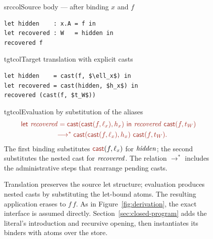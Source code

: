 \begin{figure}[!htbp]
\begin{examplepanel}{srccol}{Source body --- after binding \(x\) and \(f\)}
\begin{lstlisting}[style=source]
let hidden    : x.A = f in
let recovered : W   = hidden in
recovered f
\end{lstlisting}
\end{examplepanel}
\begin{examplepanel}{tgtcol}{Target translation with explicit casts}
\begin{lstlisting}[style=target,mathescape=true]
let hidden    = cast(f, $\ell_x$) in
let recovered = cast(hidden, $h_x$) in
recovered (cast(f, $t_W$))
\end{lstlisting}
\end{examplepanel}
\begin{examplepanel}{tgtcol}{Evaluation by substitution of the aliases}
\small
\[
\tgt{\begin{aligned}
 &\ev{let}\ \ty{recovered}=\cast{\cast{f}{\ell_x}}{h_x}\ \ev{in}\
       \ty{recovered}\ \cast{f}{t_W}\\
 &\hspace{5em}\longrightarrow^{*}
       \cast{\cast{f}{\ell_x}}{h_x}\ \cast{f}{t_W}.
\end{aligned}}
\]
The first binding substitutes \(\cast{f}{\ell_x}\) for \(\mathit{hidden}\);
the second substitutes the nested cast for \(\mathit{recovered}\).
The relation \(\longrightarrow^{*}\) includes the administrative steps
that rearrange pending casts.
\end{examplepanel}
\caption{Translation preserves the source let structure; evaluation
produces nested casts by substituting the let-bound atoms. The resulting
application erases to \(f\,f\). As in Figure~\ref{fig:derivation}, the
exact interface is assumed directly.
Section~\ref{sec:closed-program} adds the literal's introduction and
recursive opening, then instantiates its binders with atoms over the store.}
\label{fig:let-translation}
\end{figure}
